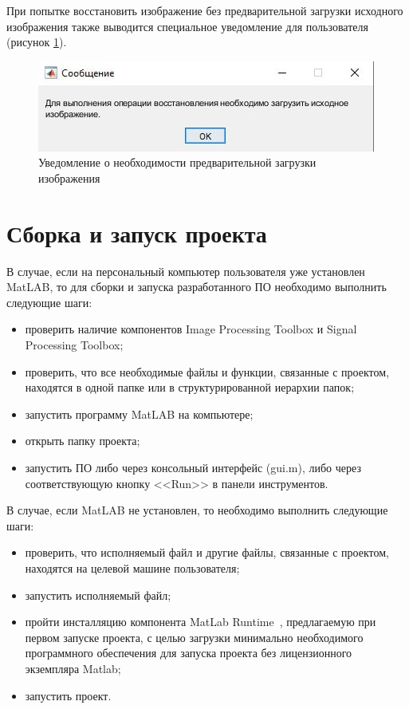 При попытке восстановить изображение без предварительной загрузки исходного изображения также выводится специальное уведомление для пользователя (рисунок \ref{load}).

\begin{figure}[H]
	\centering
	\includegraphics[scale=1]{assets/load_msg}
	\caption{Уведомление о необходимости предварительной загрузки изображения}
	\label{load}
\end{figure}

\section{Сборка и запуск проекта}

В случае, если на персональный компьютер пользователя уже установлен MatLAB, то для сборки и запуска разработанного ПО необходимо выполнить следующие шаги:

\begin{itemize}
	\item проверить наличие компонентов Image Processing Toolbox и Signal Processing Toolbox; 
	\item проверить, что все необходимые файлы и функции, связанные с проектом, находятся в одной папке или в структурированной иерархии папок;
	\item запустить программу MatLAB на компьютере;
	\item открыть папку проекта;
	\item запустить ПО либо через консольный интерфейс (gui.m), либо через соответствующую кнопку <<Run>> в панели инструментов.
\end{itemize}

В случае, если MatLAB не установлен, то необходимо выполнить следующие шаги:

\begin{itemize}
	\item проверить, что исполняемый файл и другие файлы, связанные с проектом, находятся на целевой машине пользователя;
	\item запустить исполняемый файл;
	\item пройти инсталляцию компонента MatLab Runtime~\cite{runtime}, предлагаемую при первом запуске проекта, с целью загрузки минимально необходимого программного обеспечения для запуска проекта без лицензионного экземпляра Matlab; 
	\item запустить проект.
\end{itemize}
